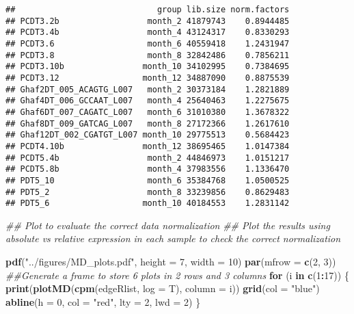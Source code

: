 \documentclass[]{article}
\newenvironment{Shaded}{\begin{snugshade}}{\end{snugshade}}
\newcommand{\CommentTok}[1]{\textcolor[rgb]{0.56,0.35,0.01}{\textit{#1}}}
\newcommand{\ControlFlowTok}[1]{\textcolor[rgb]{0.13,0.29,0.53}{\textbf{#1}}}
\newcommand{\DataTypeTok}[1]{\textcolor[rgb]{0.13,0.29,0.53}{#1}}
\newcommand{\DecValTok}[1]{\textcolor[rgb]{0.00,0.00,0.81}{#1}}
\newcommand{\KeywordTok}[1]{\textcolor[rgb]{0.13,0.29,0.53}{\textbf{#1}}}
\newcommand{\NormalTok}[1]{#1}
\newcommand{\OperatorTok}[1]{\textcolor[rgb]{0.81,0.36,0.00}{\textbf{#1}}}
\newcommand{\StringTok}[1]{\textcolor[rgb]{0.31,0.60,0.02}{#1}}
\begin{document}
\begin{verbatim}
##                             group lib.size norm.factors
## PCDT3.2b                  month_2 41879743    0.8944485
## PCDT3.4b                  month_4 43124317    0.8330293
## PCDT3.6                   month_6 40559418    1.2431947
## PCDT3.8                   month_8 32842486    0.7856211
## PCDT3.10b                month_10 34102995    0.7384695
## PCDT3.12                 month_12 34887090    0.8875539
## Ghaf2DT_005_ACAGTG_L007   month_2 30373184    1.2821889
## Ghaf4DT_006_GCCAAT_L007   month_4 25640463    1.2275675
## Ghaf6DT_007_CAGATC_L007   month_6 31010380    1.3678322
## Ghaf8DT_009_GATCAG_L007   month_8 27172366    1.2617610
## Ghaf12DT_002_CGATGT_L007 month_10 29775513    0.5684423
## PCDT4.10b                month_12 38695465    1.0147384
## PCDT5.4b                  month_2 44846973    1.0151217
## PCDT5.8b                  month_4 37983556    1.1336470
## PDT5_10                   month_6 35384768    1.0500525
## PDT5_2                    month_8 33239856    0.8629483
## PDT5_6                   month_10 40184553    1.2831142
\end{verbatim}

\begin{Shaded}
\begin{Highlighting}[]
\CommentTok{## Plot to evaluate the correct data normalization }
\CommentTok{## Plot the results using absolute vs relative expression in each sample to check the correct normalization}

\KeywordTok{pdf}\NormalTok{(}\StringTok{"../figures/MD_plots.pdf"}\NormalTok{, }\DataTypeTok{height =} \DecValTok{7}\NormalTok{, }\DataTypeTok{width =} \DecValTok{10}\NormalTok{)}
\KeywordTok{par}\NormalTok{(}\DataTypeTok{mfrow =} \KeywordTok{c}\NormalTok{(}\DecValTok{2}\NormalTok{, }\DecValTok{3}\NormalTok{)) }\CommentTok{##Generate a frame to store 6 plots in 2 rows and 3 columns}
\ControlFlowTok{for}\NormalTok{ (i }\ControlFlowTok{in} \KeywordTok{c}\NormalTok{(}\DecValTok{1}\OperatorTok{:}\DecValTok{17}\NormalTok{)) \{}
  \KeywordTok{print}\NormalTok{(}\KeywordTok{plotMD}\NormalTok{(}\KeywordTok{cpm}\NormalTok{(edgeRlist, }\DataTypeTok{log =}\NormalTok{ T), }\DataTypeTok{column =}\NormalTok{ i))}
  \KeywordTok{grid}\NormalTok{(}\DataTypeTok{col =} \StringTok{"blue"}\NormalTok{)}
  \KeywordTok{abline}\NormalTok{(}\DataTypeTok{h =} \DecValTok{0}\NormalTok{, }\DataTypeTok{col =} \StringTok{"red"}\NormalTok{, }\DataTypeTok{lty =} \DecValTok{2}\NormalTok{, }\DataTypeTok{lwd =} \DecValTok{2}\NormalTok{)}
\NormalTok{\}}
\end{Highlighting}
\end{Shaded}
\end{document}
